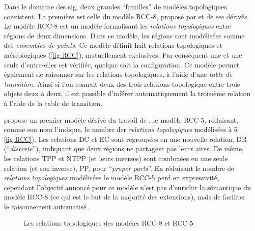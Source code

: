 Dans le domaine des \ac{sig}, deux grandes \enquote{familles} de
modèles topologiques coexistent. La première est celle du modèle
RCC-8, proposé par \textcite{Randell1992} et de ses dérivés. Le modèle
RCC-8 est un modèle formalisant les \emph{relations topologiques}
entre régions de deux dimensions. Dans ce modèle, les régions sont
modélisées comme des \emph{ensembles de points.} Ce modèle définit
huit relations topologiques et méréologiques (\autoref{fig:RCC}),
mutuellement exclusives. Par conséquent une et une seule d'entre-elles
est vérifiée, quelque soit la configuration. Ce modèle permet
également de raisonner sur les relations topologiques, à l'aide d'une
\emph{table de transition.} Ainsi si l'on connait deux des trois
relations topologique entre trois objets deux à deux, il est possible
d'inférer automatiquement la troisième relation à l'aide de la table
de transition.


\textcite{Bennett1994} propose un premier modèle dérivé du travail de
\textcite{Randell1992}, le modèle RCC-5, réduisant, comme son nom
l'indique, le nombre der \emph{relations topologiques} modélisées à 5
\autoref{fig:RCC}). Les relations DC et EC sont regroupées en une
nouvelle relation, DR (\enquote{\emph{discrete}}), indiquant que deux
régions ne partagent pas leurs aires. De même, les relations TPP et
NTPP (et leurs inverses) sont combinées en une seule relation (et son
inverse), PP, pour \enquote{\emph{proper parts}}. En réduisant le
nombre de \emph{relations topologiques} modélisées le modèle RCC-5
perd en expressivité, cependant l'objectif annoncé pour ce modèle
n'est pas d’enrichir la sémantique du modèle RCC-8 (ce qui est le but
de la majorité des extensions), mais de faciliter le raisonnement
automatisé \textcite{Bennett1994}.

\begin{figure}
  \centering
  
  \caption{Les relations topologiques des modèles RCC-8 et RCC-5}
  \label{fig:RCC}
\end{figure}

